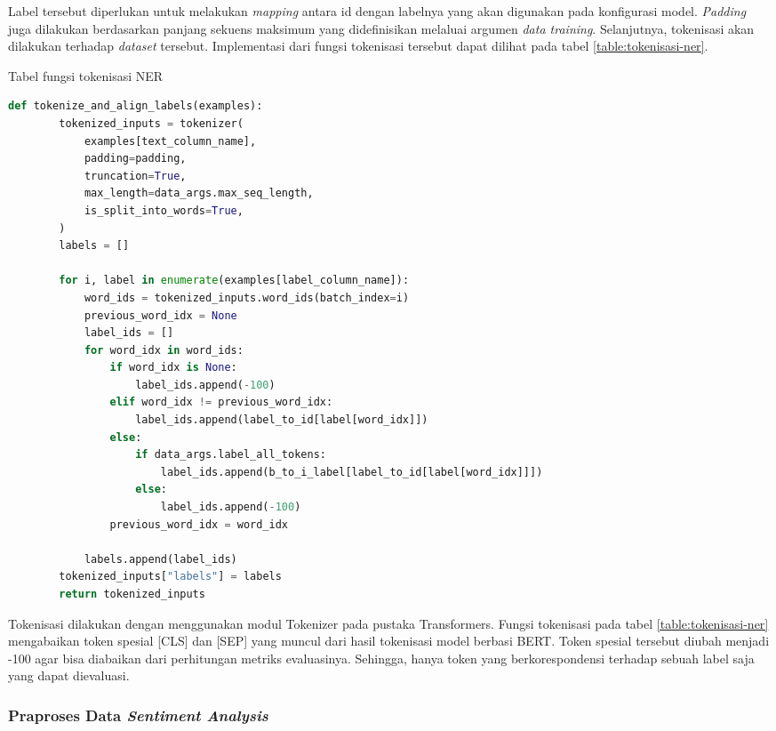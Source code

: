 Label tersebut diperlukan untuk melakukan \textit{mapping} antara id dengan labelnya yang akan digunakan pada konfigurasi model. \textit{Padding} juga dilakukan berdasarkan panjang sekuens maksimum yang didefinisikan melaluai argumen \textit{data training}. Selanjutnya, tokenisasi akan dilakukan terhadap \textit{dataset} tersebut. Implementasi dari fungsi tokenisasi tersebut dapat dilihat pada tabel \ref{table:tokenisasi-ner}.

\begin{table}[h]
    \caption{Tabel fungsi tokenisasi NER}
    \label{table:tokenisasi-ner}
    \begin{lstlisting}[language=python]
    def tokenize_and_align_labels(examples):
        tokenized_inputs = tokenizer(
            examples[text_column_name],
            padding=padding,
            truncation=True,
            max_length=data_args.max_seq_length,
            is_split_into_words=True,
        )
        labels = []

        for i, label in enumerate(examples[label_column_name]):
            word_ids = tokenized_inputs.word_ids(batch_index=i)
            previous_word_idx = None
            label_ids = []
            for word_idx in word_ids:
                if word_idx is None:
                    label_ids.append(-100)
                elif word_idx != previous_word_idx:
                    label_ids.append(label_to_id[label[word_idx]])
                else:
                    if data_args.label_all_tokens:
                        label_ids.append(b_to_i_label[label_to_id[label[word_idx]]])
                    else:
                        label_ids.append(-100)
                previous_word_idx = word_idx

            labels.append(label_ids)
        tokenized_inputs["labels"] = labels
        return tokenized_inputs
    \end{lstlisting}
\end{table}

Tokenisasi dilakukan dengan menggunakan modul Tokenizer pada pustaka Transformers. Fungsi tokenisasi pada tabel \ref{table:tokenisasi-ner} mengabaikan token spesial [CLS] dan [SEP] yang muncul dari hasil tokenisasi model berbasi BERT. Token spesial tersebut diubah menjadi -100 agar bisa diabaikan dari perhitungan metriks evaluasinya. Sehingga, hanya token yang berkorespondensi terhadap sebuah label saja yang dapat dievaluasi.

\subsubsection{Praproses Data \textit{Sentiment Analysis}}

